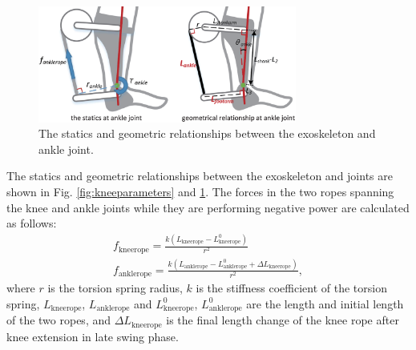 \documentclass[twocolumn,cleanfoot,10pt]{asme2ej}
\begin{document}
\begin{figure}[t]
	\centering
	\includegraphics[width=8.5cm]{ankleparameters.eps}
	\caption{The statics and geometric relationships between the exoskeleton and ankle joint.}
	\label{fig:ankleparameters}
\end{figure}


The statics and geometric relationships between the exoskeleton and joints are shown in Fig. \ref{fig:kneeparameters} and \ref{fig:ankleparameters}.
The forces in the two ropes spanning the knee and ankle joints while they are performing negative power are calculated as follows:
\begin{gather}
	f_\mathrm{kneerope} = \frac{k(L_\mathrm{kneerope}-L_\mathrm{kneerope}^0)}{r^2} \\
	f_\mathrm{anklerope} = \frac{k(L_\mathrm{anklerope}-L_\mathrm{anklerope}^0+\Delta L_\mathrm{kneerope})}{r^2},
\end{gather}
where $r$ is the torsion spring radius, $k$ is the stiffness coefficient of the torsion spring, $L_\mathrm{kneerope}$, $L_\mathrm{anklerope}$ and $L_\mathrm{kneerope}^0$, $L_\mathrm{anklerope}^0$ are the length and initial length of the two ropes, and $\Delta L_\mathrm{kneerope}$ is the final length change of the knee rope after knee extension in late swing phase.
\end{document}
